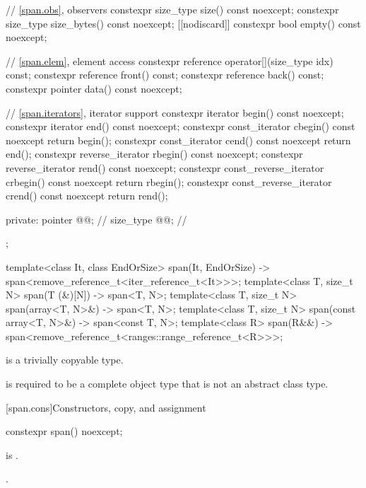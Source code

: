 \begin{codeblock}
{{    // \ref{span.obs}, observers
    constexpr size_type size() const noexcept;
    constexpr size_type size_bytes() const noexcept;
    [[nodiscard]] constexpr bool empty() const noexcept;

    // \ref{span.elem}, element access
    constexpr reference operator[](size_type idx) const;
    constexpr reference front() const;
    constexpr reference back() const;
    constexpr pointer data() const noexcept;

    // \ref{span.iterators}, iterator support
    constexpr iterator begin() const noexcept;
    constexpr iterator end() const noexcept;
    constexpr const_iterator cbegin() const noexcept { return begin(); }
    constexpr const_iterator cend() const noexcept { return end(); }
    constexpr reverse_iterator rbegin() const noexcept;
    constexpr reverse_iterator rend() const noexcept;
    constexpr const_reverse_iterator crbegin() const noexcept { return rbegin(); }
    constexpr const_reverse_iterator crend() const noexcept { return rend(); }

  private:
    pointer @@;              // \expos
    size_type @@;            // \expos
  };

  template<class It, class EndOrSize>
    span(It, EndOrSize) -> span<remove_reference_t<iter_reference_t<It>>>;
  template<class T, size_t N>
    span(T (&)[N]) -> span<T, N>;
  template<class T, size_t N>
    span(array<T, N>&) -> span<T, N>;
  template<class T, size_t N>
    span(const array<T, N>&) -> span<const T, N>;
  template<class R>
    span(R&&) -> span<remove_reference_t<ranges::range_reference_t<R>>>;
}
\end{codeblock}

\pnum
{} is
a trivially copyable type.

\pnum
{} is required to be
a complete object type that is not an abstract class type.

[span.cons]{Constructors, copy, and assignment}

%
\begin{itemdecl}
constexpr span() noexcept;
\end{itemdecl}

\begin{itemdescr}
\pnum
\constraints
{} is .

\pnum
\ensures
{}.
\end{itemdescr}

